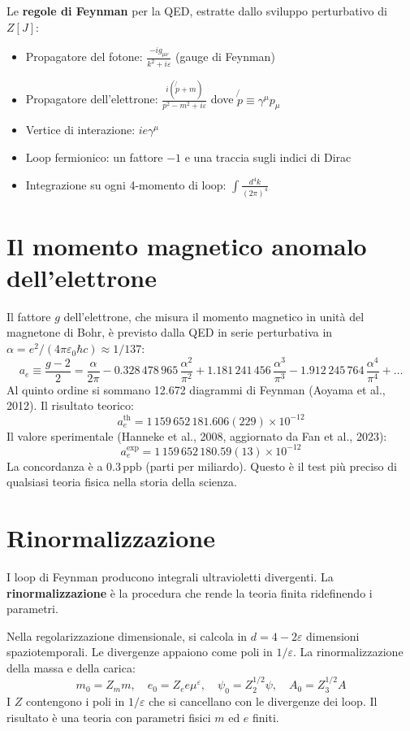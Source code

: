 \documentclass[11.5pt,a4paper,openany]{book}
\theoremstyle{remark}
\begin{document}
Le \textbf{regole di Feynman} per la QED, estratte dallo sviluppo perturbativo di $Z[J]$:
\begin{itemize}
\item Propagatore del fotone: $\displaystyle\frac{-i g_{\mu\nu}}{k^2 + i\varepsilon}$ (gauge di Feynman)
\item Propagatore dell'elettrone: $\displaystyle\frac{i(\not{p} + m)}{p^2 - m^2 + i\varepsilon}$ dove $\not{p} \equiv \gamma^\mu p_\mu$
\item Vertice di interazione: $ie\gamma^\mu$
\item Loop fermionico: un fattore $-1$ e una traccia sugli indici di Dirac
\item Integrazione su ogni 4-momento di loop: $\displaystyle\int \frac{d^4k}{(2\pi)^4}$
\end{itemize}

\section{Il momento magnetico anomalo dell'elettrone}

Il fattore $g$ dell'elettrone, che misura il momento magnetico in unità del magnetone di Bohr, è previsto dalla QED in serie perturbativa in $\alpha = e^2/(4\pi\varepsilon_0 \hbar c) \approx 1/137$:
\[
a_e \equiv \frac{g-2}{2} = \frac{\alpha}{2\pi} - 0.328\,478\,965\,\frac{\alpha^2}{\pi^2} + 1.181\,241\,456\,\frac{\alpha^3}{\pi^3} - 1.912\,245\,764\,\frac{\alpha^4}{\pi^4} + \ldots
\]
Al quinto ordine si sommano 12.672 diagrammi di Feynman (Aoyama et al., 2012). Il risultato teorico:
\[
a_e^{\text{th}} = 1\,159\,652\,181.606(229) \times 10^{-12}
\]
Il valore sperimentale (Hanneke et al., 2008, aggiornato da Fan et al., 2023):
\[
a_e^{\text{exp}} = 1\,159\,652\,180.59(13) \times 10^{-12}
\]
La concordanza è a $0.3\,\text{ppb}$ (parti per miliardo). Questo è il test più preciso di qualsiasi teoria fisica nella storia della scienza.

\section{Rinormalizzazione}

I loop di Feynman producono integrali ultravioletti divergenti. La \textbf{rinormalizzazione} è la procedura che rende la teoria finita ridefinendo i parametri.

Nella regolarizzazione dimensionale, si calcola in $d = 4 - 2\varepsilon$ dimensioni spaziotemporali. Le divergenze appaiono come poli in $1/\varepsilon$. La rinormalizzazione della massa e della carica:
\[
m_0 = Z_m m, \quad e_0 = Z_e e \mu^\varepsilon, \quad \psi_0 = Z_2^{1/2} \psi, \quad A_0 = Z_3^{1/2} A
\]
I $Z$ contengono i poli in $1/\varepsilon$ che si cancellano con le divergenze dei loop. Il risultato è una teoria con parametri fisici $m$ ed $e$ finiti.
\end{document}
